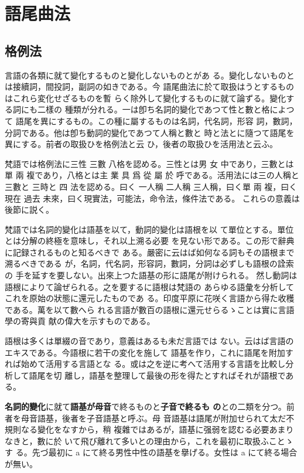 \chapter{語尾曲法}\label{cha:flection}
\section{格例法}
\numberParagraph
言語の各類に就て變化するものと變化しないものとがあ
る。變化しないものとは接續詞，間投詞，副詞の如きである。今
語尾曲法に於て取扱はうとするものはこれら変化せざるものを暫
らく除外して變化するものに就て論ずる。變化する詞にも二樣の
種類が分れる。一は卽ち名詞的變化であつて性と數と格によつて
語尾を異にするもの。この種に屬するものは名詞，代名詞，形容
詞，數詞，分詞である。他は卽ち動詞的變化であつて人稱と數と
時と法とに隨つて語尾を異にする。前者の取扱ひを格例法と云
ひ，後者の取扱ひを活用法と云ふ。

\numberParagraph
梵語では格例法に三性 三數 八格を認める。三性とは男
女 中であり，三數とは單 兩 複であり，八格とは主 業 具 爲
從 屬 於 呼である。活用法には三の人稱と 三數と 三時と 四
法を認める。曰く 一人稱 二人稱 三人稱，曰く單 兩 複，曰く
現在 過去 未來，曰く現實法，可能法，命令法，條件法である。
これらの意義は後節に説く。

\numberParagraph
梵語では名詞的變化は語基を以て，動詞的變化は語根を以
て單位とする。單位とは分解の終極を意味し，それ以上溯る必要
を見ない形である。この形で辭典に記録されるものと知るべきで
ある。嚴密に云はば如何なる詞もその語根まで溯るべきである
が，名詞，代名詞，形容詞，數詞，分詞は必ずしも語根の詮索の
手を延すを要しない。出來上つた語基の形に語尾が附けられる。
然し動詞は語根によりて論ぜられる。之を要するに語根は梵語の
あらゆる語彙を分析してこれを原始の狀態に還元したものであ
る。印度平原に花咲く言語から得た收穫である。萬を以て數へら
れる言語が數百の語根に還元せらるゝことは實に言語學の寄與貢
献の偉大を示すものである。

\numberParagraph
語根は多くは單綴の音であり，意義はあるも未だ言語では
ない。云はば言語のエキスである。今語根に若干の変化を施して
語基を作り，これに語尾を附加すれば始めて活用する言語とな
る。或は之を逆に考へて活用する言語を比較し分析して語尾を切
離し，語基を整理して最後の形を得たとすればそれが語根であ
る。

\numberParagraph
\textbf{名詞的變化}に就て\textbf{語基が母音}で終るものと\textbf{子音で終るも
  の}との二類を分つ。前者を母音語基，後者を子音語基と呼ぶ。母
音語基は語尾が附加せられて太だ不規則なる變化をなすから，稍
複雜ではあるが，語基に强弱を認むる必要あまりなきと，數に於
いて飛び離れて多いとの理由から，これを最初に取扱ふことゝす
る。先づ最初に a にて終る男性中性の語基を擧げる。女性は a
にて終る場合が無い。


